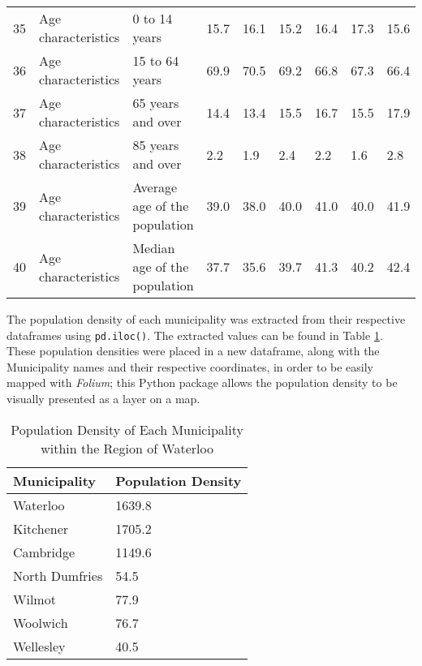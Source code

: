\documentclass[10pt,a4paper]{report}
\begin{document}
\begin{table}[H]
\begin{adjustbox}{width=1\textwidth}
\begin{tabular}{@{}lllllllll@{}}
				35 & Age characteristics      & 0 to 14 years                                                                & 15.7   & 16.1    & 15.2    & 16.4       & 17.3      & 15.6       \\
				36 & Age characteristics      & 15 to 64 years                                                               & 69.9   & 70.5    & 69.2    & 66.8       & 67.3      & 66.4       \\
				37 & Age characteristics      & 65 years and over                                                            & 14.4   & 13.4    & 15.5    & 16.7       & 15.5      & 17.9       \\
				38 & Age characteristics      & 85 years and over                                                            & 2.2    & 1.9     & 2.4     & 2.2        & 1.6       & 2.8        \\
				39 & Age characteristics      & Average age of the population                                                & 39.0   & 38.0    & 40.0    & 41.0       & 40.0      & 41.9       \\
				40 & Age characteristics      & Median age of the population                                                 & 37.7   & 35.6    & 39.7    & 41.3       & 40.2      & 42.4       \\ \bottomrule
			\end{tabular}
		\end{adjustbox}
	\end{table}
	
	
	The population density of each municipality was extracted from their respective dataframes using \texttt{pd.iloc()}. The extracted values can be found in Table \ref{MunicipalityPopulationDensity}. These population densities were placed in a new dataframe, along with the Municipality names and their respective coordinates, in order to be easily mapped with \textit{Folium}; this Python package allows the population density to be visually presented as a layer on a map.
	
	

	\begin{table}[h!]
		\centering
		\caption{Population Density of Each Municipality within the Region of Waterloo}
		\label{MunicipalityPopulationDensity}
		\begin{tabular}{@{}ll@{}}
			\toprule
			Municipality   & Population Density \\
			 \midrule
			Waterloo       & 1639.8             \\
			Kitchener      & 1705.2             \\
			Cambridge      & 1149.6             \\
			North Dumfries & 54.5               \\
			Wilmot         & 77.9               \\
			Woolwich       & 76.7               \\
			Wellesley      & 40.5  \\    \bottomrule
		\end{tabular}
	\end{table}
	
\end{document}
